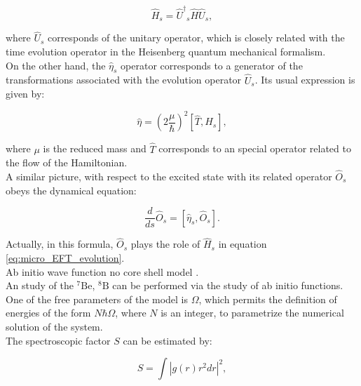 \documentclass[openany]{book}
\begin{document}
 \begin{equation}\label{eq:micro_EFT_hamiltonian_heisenberg}
	\hat H_s = {{\hat U}^{\dagger}}_s \hat H \hat U_s,
 \end{equation}

where $\hat U_s$ corresponds of the unitary operator, which is closely related with the time evolution operator in the Heisenberg quantum mechanical formalism. \\

On the other hand, the $\hat \eta_s$ operator corresponds to a generator of the transformations associated with the evolution operator  $\hat U_s$. Its usual expression is given by:
 
  \begin{equation}\label{eq:micro_EFT_hamiltonian_generator}
 	\hat \eta = \left(2 \frac{\mu }{\hbar}\right)^2 [\hat T, \hat H_s],
 \end{equation}

where $\mu$ is the reduced mass and $\hat T$ corresponds to an special operator related to the flow of the Hamiltonian.\\

A similar picture, with respect to the excited state with its related operator $\hat O_s$ obeys the dynamical equation: 

\begin{equation}\label{eq:micro_EFT_evolution_excited}
	\frac{d}{ds}\hat O_s = [\hat \eta_s, \hat O_s].
\end{equation}

Actually, in this formula, $\hat O_s$ plays the role of $\hat H_s$ in equation \ref{eq:micro_EFT_evolution}.\\
 
Ab initio wave function no core shell model \cite{navratil_bertulani_caurier_2006}. \\

An study of the $\mathrm{{}^{7}Be}$,  $\mathrm{{}^{8}B}$ can be performed via the study of ab initio functions. One of the free parameters of the model is $\Omega$, which permits the definition of energies of the form $N\hbar \Omega$, where $N$ is an integer, to parametrize the numerical solution of the system. \\

The spectroscopic factor $S$ can be estimated by: 

\begin{equation}\label{eq:micro_NCSH_application_S}
	S = \int { \left| g (r)  r^2 dr \right|^2},
\end{equation}
\end{document}
